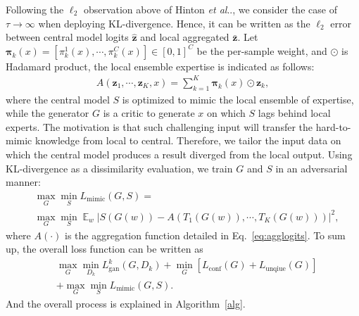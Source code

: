 \documentclass[letterpaper]{article} %
\makeatletter
\DeclareRobustCommand\onedot{\futurelet\@let@token\@onedot}
\def\@onedot{\ifx\@let@token.\else.\null\fi\xspace}
\DeclareMathOperator*{\fe}{\mathbb{E}}
\def\etal{\emph{et al}\onedot}
\newcommand{\Loss}{\mathcal{L}}
\newcommand{\domw}{\mathcal{W}}
\makeatother
\begin{document}
Following the $\ell_2$ observation above of Hinton \etal \cite{hinton2015distilling}, we consider the case of $\tau \rightarrow \infty$ when deploying KL-divergence. Hence, it can be written as the $\ell_2$ error between central model logits $\hat{\bm{z}}$ and local aggregated $\bar{\bm{z}}$. Let $\bm{\pi}_k(x) =[\pi_k^1(x),\cdots,\pi_k^C(x)] \in [0,1]^C$ be the per-sample weight, and $\odot$ is Hadamard product, the local ensemble expertise is indicated as follows:
\begin{equation}
\label{eq:agglogits}
\begin{aligned}
    A(\bm{z}_1, \cdots, \bm{z}_K, x) = \sum_{k=1}^K \bm{\pi}_k(x) \odot \bm{z}_k,
\end{aligned}
\end{equation}
where the central model $S$ is optimized to mimic the local ensemble of expertise, while the generator $G$ is a critic to generate $x$ on which $S$ lags behind local experts. The motivation is that such challenging input will transfer the hard-to-mimic knowledge from local to central. Therefore, we tailor the input data on which the central model produces a result diverged from the local output. Using KL-divergence as a dissimilarity evaluation, we train $G$ and $S$ in an adversarial manner:
\begin{equation}
\label{eq:mimicloss}
\begin{aligned}
    &\max_G \min_S L_\text{mimic}(G, S)  
   = \\&\max_G \min_S 
   \fe_{w} 
   | S(G(w)) - A(T_1(G(w)), \cdots, T_K(G(w)))|^2,
\end{aligned}
\end{equation}
where $A(\cdot)$ is the aggregation function detailed in Eq.~\ref{eq:agglogits}.
To sum up, the overall loss function can be written as 
\begin{equation}
\label{eq:overallloss}
\begin{aligned}
   &\max_G \min_{D_k} L_\text{gan}^k(G, D_k) +\min_G [L_\text{conf}(G) + L_\text{unqiue}(G)] \\
   & +\max_G \min_S L_\text{mimic}(G, S).
\end{aligned}
\end{equation}
And the overall process is explained in Algorithm~\ref{alg}. 
\end{document}
